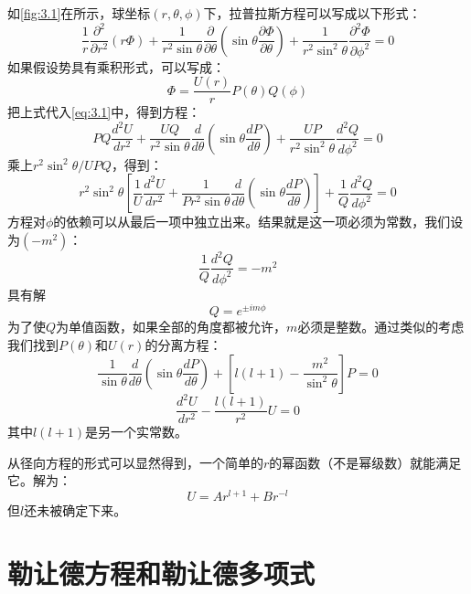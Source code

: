 \documentclass[12pt]{book}
\numberwithin{equation}{chapter}
\numberwithin{figure}{chapter}
\numberwithin{footnote}{page}
\begin{document}
如\autoref{fig:3.1}在所示，球坐标$(r,\theta,\phi)$下，拉普拉斯方程可以写成以下形式：
\begin{equation}\label{eq:3.1}
    \frac{1}{r}\frac{\partial^2}{\partial r^2}(r\Phi)+\frac{1}{r^2\sin\theta}\frac{\partial}{\partial \theta}(\sin\theta\frac{\partial\Phi}{\partial\theta})+\frac{1}{r^2\sin^2\theta}\frac{\partial^2 \Phi}{\partial\phi^2}=0
\end{equation}
如果假设势具有乘积形式，可以写成：
\begin{equation}\label{eq:3.2}
    \Phi=\frac{U(r)}{r}P(\theta)Q(\phi)
\end{equation}
把上式代入\autoref{eq:3.1}中，得到方程：
$$PQ\frac{d^2U}{dr^2}+\frac{UQ}{r^2\sin\theta}\frac{d}{d\theta}(\sin\theta\frac{dP}{d\theta})+\frac{UP}{r^2\sin^2\theta}\frac{d^2Q}{d\phi^2}=0$$
乘上$r^2\sin^2\theta/UPQ$，得到：
\begin{equation}\label{eq:3.3}
    r^2\sin^2\theta[\frac{1}{U}\frac{d^2U}{dr^2}+\frac{1}{Pr^2\sin\theta}\frac{d}{d\theta}(\sin\theta\frac{dP}{d\theta})]+\frac{1}{Q}\frac{d^2Q}{d\phi^2}=0
\end{equation}
方程对$\phi$的依赖可以从最后一项中独立出来。结果就是这一项必须为常数，我们设为$(-m^2)$：
\begin{equation}\label{eq:3.4}
    \frac{1}{Q}\frac{d^2Q}{d\phi^2}=-m^2
\end{equation}
具有解
\begin{equation}\label{eq:3.5}
    Q=e^{\pm im\phi}
\end{equation}
为了使$Q$为单值函数，如果全部的角度都被允许，$m$必须是整数。通过类似的考虑我们找到$P(\theta)$和$U(r)$的分离方程：
\begin{equation}\label{eq:3.6}
    \frac{1}{\sin\theta}\frac{d}{d\theta}(\sin\theta\frac{dP}{d\theta})+[l(l+1)-\frac{m^2}{\sin^2\theta}]P=0
\end{equation}
\begin{equation}\label{eq:3.7}
    \frac{d^2U}{dr^2}-\frac{l(l+1)}{r^2}U=0
\end{equation}
其中$l(l+1)$是另一个实常数。

从径向方程的形式可以显然得到，一个简单的$r$的幂函数（不是幂级数）就能满足它。解为：
\begin{equation}\label{eq:3.8}
    U=Ar^{l+1}+Br^{-l}
\end{equation}
但$l$还未被确定下来。

\section{勒让德方程和勒让德多项式}\label{sec:3.2}
\end{document}
